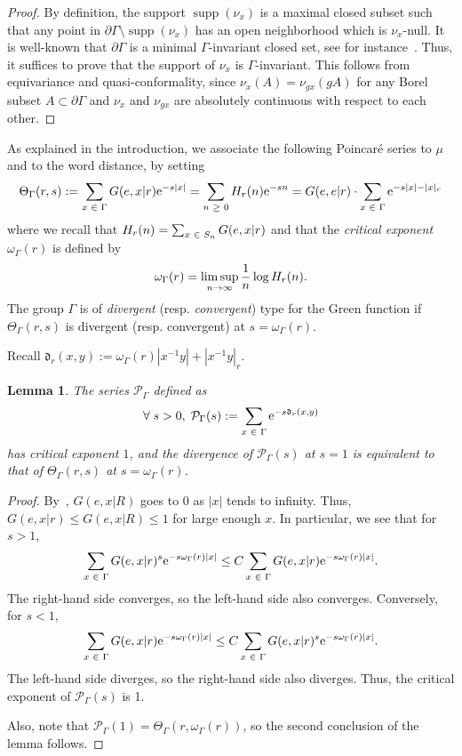 \documentclass[10pt,a4paper]{amsart}
\newcommand{\pG}{\partial{\Gamma}}
\newcommand{\rme}{\mathrm{e}}
\newcommand{\fkd}{\mathfrak{d}}
\newcommand{\clP}{\mathcal{P}}
\DeclareMathOperator{\supp}{supp}
\let\oldin\in
\renewcommand{\in}{\mathchoice{\oldin}{\oldin}{\,\oldin\,}{\,\oldin\,}}
\let\oldge\ge
\renewcommand{\ge}{\mathchoice{\oldge}{\oldge}{\,\oldge\,}{\,\oldge\,}}
\renewcommand*{\to}{\mathchoice{\longrightarrow}{\rightarrow}{\rightarrow}{\rightarrow}}
\let\oldforall\forall
\renewcommand*{\forall}{\mathrel{\oldforall}}
\newtheorem{lemm}[theo]{Lemma}
\theoremstyle{definition}\newtheorem{defi}[theo]{Definition}
\begin{document}
\begin{proof}
By definition, the support $\supp(\nu_x)$ is a maximal closed subset such that any point in $\pG \setminus \supp(\nu_x)$ has an open neighborhood which is $\nu_x$-null. It is well-known that $\pG$ is a minimal $\Gamma$-invariant closed set, see for instance~\cite[Section~2]{Bo99}. Thus, it suffices to prove that the support of $\nu_x$ is $\Gamma$-invariant. This follows from equivariance and quasi-conformality, since $\nu_x(A)=\nu_{gx}(gA)$ for any Borel subset $A\subset \pG$ and $\nu_x$ and $\nu_{gx}$ are absolutely continuous with respect to each other.
\end{proof}

As explained in the introduction, we associate the following Poincaré series to $\mu$ and to the word distance, by setting
\begin{align*}
\Theta_\Gamma({r, s}) := \sum_{x\in \Gamma} G(e, x |r) \rme^{-s|x|} = \sum_{n\ge 0} H_r(n) \rme^{-sn} =G(e,e|r)\cdot \sum_{x\in \Gamma} \rme^{-s|x|-|x|_r}
\end{align*}
where we recall that $H_r(n)=\sum_{x\in S_n} G(e,x|r)$ and that the
\emph{critical exponent} $\omega_\Gamma(r)$ is defined by
\[
\omega_\Gamma(r) = \limsup\limits_{n \to \infty} \frac{1}{n} \log H_r(n).
\]
The group $\Gamma$ is of \emph{divergent} (resp.
\emph{convergent}) type {for the Green function} if $\Theta_\Gamma({r,s})$ is divergent (resp. convergent) at $s=\omega_\Gamma(r)$.

Recall $\fkd_r(x,y):=\omega_\Gamma(r)|x^{-1}y| +|x^{-1}y|_r$.
\begin{lemm}\label{NewPoincareSeries}
The series $\clP_\Gamma$ defined as
\[
\forall s>0,\;\clP_{\Gamma}(s):=\sum\limits_{x \in \Gamma} \rme^{- s \fkd_r(x,y)}
\]
has critical exponent $1$, and the divergence of $\clP_{\Gamma}(s)$ at $s=1$ is equivalent to that of $\Theta_\Gamma({r,s})$ at $s=\omega_\Gamma(r)$.
\end{lemm}

\begin{proof}
By~\cite[Lemma~2.1]{GouezelLalley}, $G(e,x|R)$ goes to 0 as $|x|$ tends to infinity. Thus, $G(e,x|r)\leq G(e,x|R)\leq 1$ for large enough $x$. In particular, we see that for $s> 1$,
\[
\sum_{x\in \Gamma}G(e,x|r)^s\rme^{-s\omega_\Gamma(r) |x|}\leq C \sum_{x\in \Gamma}G(e,x|r)\rme^{-s\omega_\Gamma(r) |x|}.
\]
The right-hand side converges, so the left-hand side also converges. Conversely, for $s<1$,
\[
\sum_{x\in \Gamma}G(e,x|r)\rme^{-s\omega_\Gamma(r) |x|}\leq C \sum_{x\in \Gamma}G(e,x|r)^s\rme^{-s\omega_\Gamma(r) |x|}.
\]
The left-hand side diverges, so the right-hand side also diverges. Thus, the critical exponent of $\clP_\Gamma(s)$ is 1.

Also, note that $\clP_\Gamma(1)=\Theta_\Gamma(r,\omega_\Gamma(r))$, so the second conclusion of the lemma follows.
\end{proof}
\end{document}
